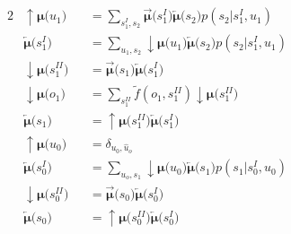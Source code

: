\documentclass[fleqn]{article}
\begin{document}
\noindent
\begin{minipage}[t]{0.5\textwidth}
    \begin{alignat}{2}
         & \bm{{\uparrow}{\mu}(}u_1\bm{)}                            &  & = \sum_{s^{\scriptscriptstyle I}_1, s_2} \bm{\overrightarrow{\mu}(}s^{\scriptscriptstyle I}_1\bm{)} \bm{\overleftarrow{\mu}(}s_2\bm{)} p(s_2|{s^{\scriptscriptstyle I}_1},u_1) \\
         & \bm{\overleftarrow{\mu}(}s^{\scriptscriptstyle I}_1\bm{)} &  & = \sum_{u_1, s_2} \bm{{\downarrow}{\mu}(}u_1\bm{)} \bm{\overleftarrow{\mu}(}s_2\bm{)} p(s_2|s^{\scriptscriptstyle I}_1,u_1)                                                    \\
         & \bm{{\downarrow}{\mu}(}s^{\scriptscriptstyle II}_1\bm{)}  &  & = \bm{\overrightarrow{\mu}(}s_1\bm{)} \bm{\overleftarrow{\mu}(}s^{\scriptscriptstyle I}_1\bm{)}                                                                                \\
         & \bm{{\downarrow}{\mu}(}o_1\bm{)}                          &  & = \sum_{s^{\scriptscriptstyle II}_1} \tilde{f}(o_1,s^{\scriptscriptstyle II}_1) \bm{{\downarrow}{\mu}(}s^{\scriptscriptstyle II}_1\bm{)}                                       \\
         & \bm{\overleftarrow{\mu}(}s_1\bm{)}                        &  & = \bm{{\uparrow}{\mu}(}s^{\scriptscriptstyle II}_1\bm{)} \bm{\overleftarrow{\mu}(}s^{\scriptscriptstyle I}_1\bm{)}                                                             \\
         & \bm{{\uparrow}{\mu}(}u_0\bm{)}                            &  & = \delta_{u_0, \hat{u}_o}                                                                                                                                                      \\
         & \bm{\overleftarrow{\mu}(}s^{\scriptscriptstyle I}_0\bm{)} &  & = \sum_{u_o, s_1} \bm{{\downarrow}{\mu}(}u_0\bm{)} \bm{\overleftarrow{\mu}(}s_1\bm{)} p(s_1|s^{\scriptscriptstyle I}_0,u_0)                                                    \\
         & \bm{{\downarrow}{\mu}(}s^{\scriptscriptstyle II}_0\bm{)}  &  & = \bm{\overrightarrow{\mu}(}s_0\bm{)} \bm{\overleftarrow{\mu}(}s^{\scriptscriptstyle I}_0\bm{)}                                                                                \\
         & \bm{\overleftarrow{\mu}(}s_0\bm{)}                        &  & = \bm{{\uparrow}{\mu}(}s^{\scriptscriptstyle II}_0\bm{)} \bm{\overleftarrow{\mu}(}s^{\scriptscriptstyle I}_0\bm{)}
    \end{alignat}
\end{minipage}%
\end{document}
